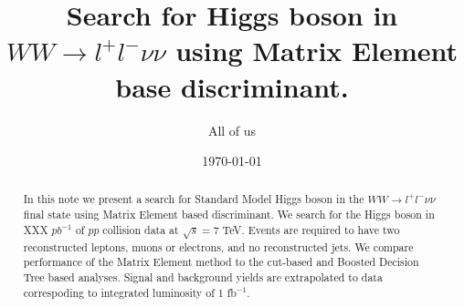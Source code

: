\documentclass{cmspaper}
\begin{document}


\title{Search for Higgs boson in $WW \rightarrow l^{+}l^{-}\nu\nu$ using Matrix Element base discriminant.}



\author{All of us}



\date{\today}

\begin{abstract}
In this note we present a search for Standard Model Higgs boson in the $WW \rightarrow l^{+}l^{-}\nu\nu$ final state 
using Matrix Element based discriminant. We search for the Higgs boson in XXX $pb^{-1}$ of $pp$ collision data at
$\sqrt{s}=7$ TeV. Events are required to have two reconstructed leptons, muons or electrons, and no reconstructed jets.
We compare performance of the Matrix Element method to the cut-based and Boosted Decision Tree based analyses. 
Signal and background yields are extrapolated to data correspoding to integrated luminosity of 1 fb$^{-1}$. 
\end{abstract}


\maketitle
\end{document}
